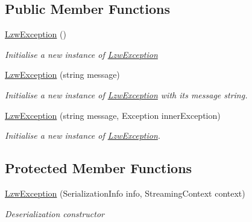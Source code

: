 \subsection*{Public Member Functions}
\begin{DoxyCompactItemize}
\item 
\hyperlink{class_i_c_sharp_code_1_1_sharp_zip_lib_1_1_l_z_w_1_1_lzw_exception_ab9727634d4308ab425c1616e2bb8b6d5}{Lzw\+Exception} ()
\begin{DoxyCompactList}\small\item\em Initialise a new instance of \hyperlink{class_i_c_sharp_code_1_1_sharp_zip_lib_1_1_l_z_w_1_1_lzw_exception}{Lzw\+Exception} \end{DoxyCompactList}\item 
\hyperlink{class_i_c_sharp_code_1_1_sharp_zip_lib_1_1_l_z_w_1_1_lzw_exception_ae9076c8eab9776557e41beac11633bc6}{Lzw\+Exception} (string message)
\begin{DoxyCompactList}\small\item\em Initialise a new instance of \hyperlink{class_i_c_sharp_code_1_1_sharp_zip_lib_1_1_l_z_w_1_1_lzw_exception}{Lzw\+Exception} with its message string. \end{DoxyCompactList}\item 
\hyperlink{class_i_c_sharp_code_1_1_sharp_zip_lib_1_1_l_z_w_1_1_lzw_exception_a02caaff45f8349b8cac57037ad7f1155}{Lzw\+Exception} (string message, Exception inner\+Exception)
\begin{DoxyCompactList}\small\item\em Initialise a new instance of \hyperlink{class_i_c_sharp_code_1_1_sharp_zip_lib_1_1_l_z_w_1_1_lzw_exception}{Lzw\+Exception}. \end{DoxyCompactList}\end{DoxyCompactItemize}
\subsection*{Protected Member Functions}
\begin{DoxyCompactItemize}
\item 
\hyperlink{class_i_c_sharp_code_1_1_sharp_zip_lib_1_1_l_z_w_1_1_lzw_exception_a0d563550c4fe9394bac7e032e341a178}{Lzw\+Exception} (Serialization\+Info info, Streaming\+Context context)
\begin{DoxyCompactList}\small\item\em Deserialization constructor \end{DoxyCompactList}\end{DoxyCompactItemize}



